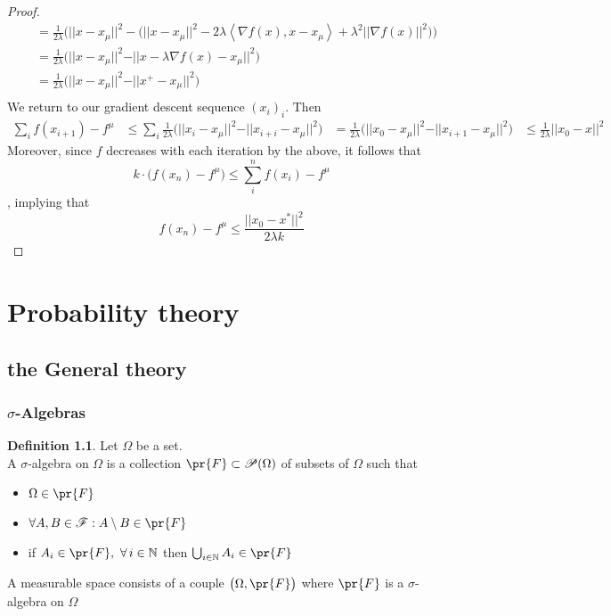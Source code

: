 \documentclass{book}
\theoremstyle{plain}
\theoremstyle{definition}
\newtheorem{definition}[corollary]{Definition}
\newcommand{\bl}[2]{\left\langle #1,#2\right\rangle}
\renewcommand{\d}[1]{\mathbb{#1}}
\newcommand{\norm}[1]{\vert \vert #1 \vert \vert}
\renewcommand{\r}[1]{\mathcal{#1}}
\begin{document}
\begin{proof}
\begin{align*}
 & = \frac{1}{2\lambda}\bigg(\vert \vert x - x_\mu\vert \vert^2 -\big(\vert \vert x-x_\mu \vert \vert^2 -2\lambda \bl{\nabla f(x)}{x -x_\mu}+\lambda^2\vert \vert \nabla f(x)\vert \vert^2 \big)\bigg)\\
 &=\frac{1}{2\lambda}\bigg(\vert \vert x-x_\mu\vert \vert^2-\vert \vert x-\lambda \nabla f(x)-x_\mu \vert \vert^2 \bigg)\\
 &=\frac{1}{2\lambda}\bigg(\vert \vert x-x_\mu\vert \vert^2-\vert \vert x^+-x_\mu \vert \vert^2 \bigg)\\
 \end{align*}
We return to our gradient descent sequence $(x_i)_i$. Then
\begin{align*}
\sum_i f(x_{i+1})-f^\mu	& \le \sum_i \frac{1}{2\lambda}\bigg(\vert \vert x_i-x_\mu\vert \vert^2-\vert \vert x_{i+i}-x_\mu \vert \vert^2 \bigg)
&= \frac{1}{2\lambda}\bigg(\vert \vert x_0-x_\mu\vert \vert^2-\vert \vert x_{i+1}-x_\mu \vert \vert^2 \bigg)
&\le \frac{1}{2\lambda}\vert \vert x_0-x\vert\vert^2
\end{align*}
Moreover, since $f$ decreases with each iteration by the above, it follows that 
\[k\cdot \big(f(x_n)-f^\mu\big)\le \sum^n_i f(x_i)-f^\mu
\], implying that
\[
f(x_{n})-f^\mu\le \frac{\norm{x_0-x^*}^2}{2\lambda k}
\]
\end{proof}


\chapter{Probability theory}
\section{the General theory}

\subsection{$\sigma$-Algebras}
\begin{definition}
Let $\Omega$ be a set.\\
A $\sigma$-algebra on $\Omega$ is a collection $\pr{F}\subset \r{P}(\Omega)$ of subsets of $\Omega$ such that
\begin{itemize}
\item $\Omega \in \pr{F}$
\item $\forall A, B \in\r{F}: A\setminus B \in\pr{F}$
\item if $A_i\in\pr{F},\,\,\forall \,i \in \d{N}$ then $\bigcup_{i \in \d{N}} A_i \in \pr{F}$
\end{itemize}
A measurable space consists of a couple $\big(\Omega,\pr{F}\big)$ where $\pr{F}$ is a $\sigma$-algebra on $\Omega$
\end{definition}
\end{document}
